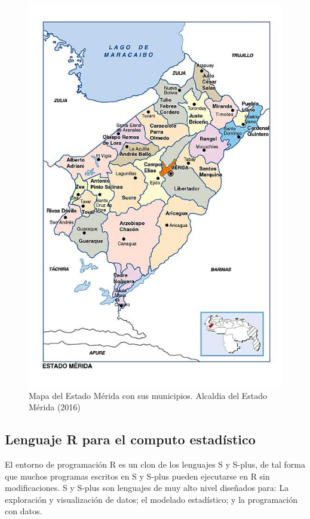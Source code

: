 \begin{figure}[H]
	 \centering
	 \includegraphics[scale=0.5]{merida.jpg}
	 \caption{Mapa del Estado M\'erida con sus municipios. Alcaldia del Estado M\'erida (2016)}
	 \end{figure}

\subsection{Lenguaje R para el computo estad\'istico}

El entorno de programaci\'on R es un clon de los lenguajes S y S-plus, de tal forma que muchos programas escritos en S y S-plus pueden ejecutarse en R sin modificaciones. S y S-plus son lenguajes de muy alto nivel diseñados para: La exploraci\'on y visualizaci\'on de datos; el modelado estad\'istico; y la programaci\'on con datos. \\

